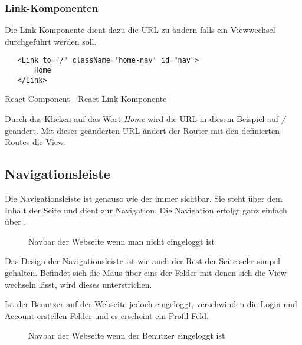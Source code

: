 \subsubsection{Link-Komponenten}
\label{React-Links}
Die Link-Komponente dient dazu die URL zu ändern falls ein Viewwechsel durchgeführt werden soll.
\begin{code}[htp]
\begin{lstlisting}
   <Link to="/" className='home-nav' id="nav">
       Home
   </Link>
\end{lstlisting}
\caption{React Component - React Link Komponente}
\end{code}
Durch das Klicken auf das Wort \textit{Home} wird die URL in diesem Beispiel auf \textit{/} geändert.
Mit dieser geänderten URL ändert der Router mit den definierten Routes die View.
\newpage
\subsection{Navigationsleiste}
\label{nav}

Die Navigationsleiste ist genauso wie der \underline{} immer sichtbar. Sie steht über dem Inhalt der Seite und 
dient zur Navigation. Die Navigation erfolgt ganz einfach über \underline{}.

\begin{figure}[H]
  \begin{center}
    \caption{Navbar der Webseite wenn man nicht eingeloggt ist}
  \end{center}
\end{figure}

Das Design der Navigationsleiste ist wie auch der Rest der Seite sehr simpel gehalten. Befindet sich
die Maus über eins der Felder mit denen sich die View wechseln lässt, wird dieses unterstrichen.


Ist der Benutzer auf der Webseite jedoch eingeloggt, verschwinden die Login und Account erstellen 
Felder und es erscheint ein Profil Feld.

\begin{figure}[H]
    \begin{center}
      \caption{Navbar der Webseite wenn der Benutzer eingeloggt ist}
    \end{center}
\end{figure}

